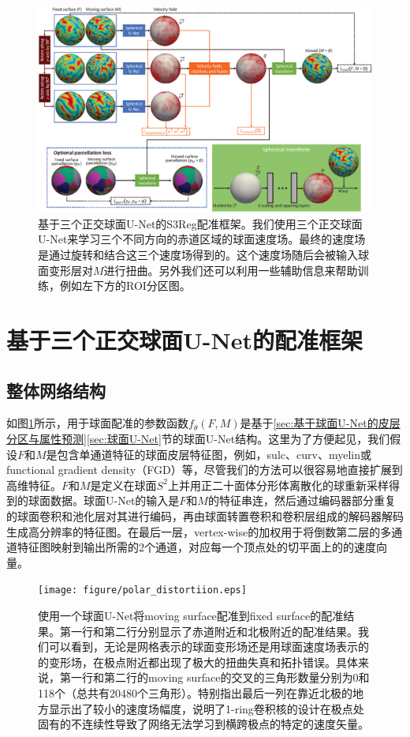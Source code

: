 \begin{figure}[t]
	\centering
	\includegraphics[width=\linewidth]{figure/network.eps}
	\caption{基于三个正交球面U-Net的S3Reg配准框架。我们使用三个正交球面U-Net来学习三个不同方向的赤道区域的球面速度场。最终的速度场是通过旋转和结合这三个速度场得到的。这个速度场随后会被输入球面变形层对$M$进行扭曲。另外我们还可以利用一些辅助信息来帮助训练，例如左下方的ROI分区图。}
	\label{fig:S3Reg_network}
\end{figure}

\section{基于三个正交球面U-Net的配准框架}\label{sec:基于三个正交球面U-Net的配准框架}

\subsection{整体网络结构}
如图\ref{fig:S3Reg_network}所示，用于球面配准的参数函数$f_\theta(F,M)$是基于\ref{sec:基于球面U-Net的皮层分区与属性预测}\ref{sec:球面U-Net}节的球面U-Net结构。这里为了方便起见，我们假设$F$和$M$是包含单通道特征的球面皮层特征图，例如，sulc、curv、myelin或functional gradient density（FGD）等，尽管我们的方法可以很容易地直接扩展到高维特征。$F$和$M$是定义在球面$S^2$上并用正二十面体分形体\cite{fischl2012freesurfer}离散化的球重新采样得到的球面数据。球面U-Net的输入是$F$和$M$的特征串连，然后通过编码器部分重复的球面卷积和池化层对其进行编码，再由球面转置卷积和卷积层组成的解码器解码生成高分辨率的特征图。在最后一层，vertex-wise的加权用于将倒数第二层的多通道特征图映射到输出所需的2个通道，对应每一个顶点处的切平面上的的速度向量。

\begin{figure}[t]
	\centering
	\texttt{[image: figure/polar\_distortiion.eps]}
	\caption{使用一个球面U-Net将moving surface配准到fixed surface的配准结果。第一行和第二行分别显示了赤道附近和北极附近的配准结果。我们可以看到，无论是网格表示的球面变形场还是用球面速度场表示的的变形场，在极点附近都出现了极大的扭曲失真和拓扑错误。具体来说，第一行和第二行的moving surface的交叉的三角形数量\cite{moller1997fast}分别为0和118个（总共有20480个三角形）。特别指出最后一列在靠近北极的地方显示出了较小的速度场幅度，说明了1-ring卷积核的设计在极点处固有的不连续性导致了网络无法学习到横跨极点的特定的速度矢量。}
	\label{fig:polar_distortiion}
\end{figure}

